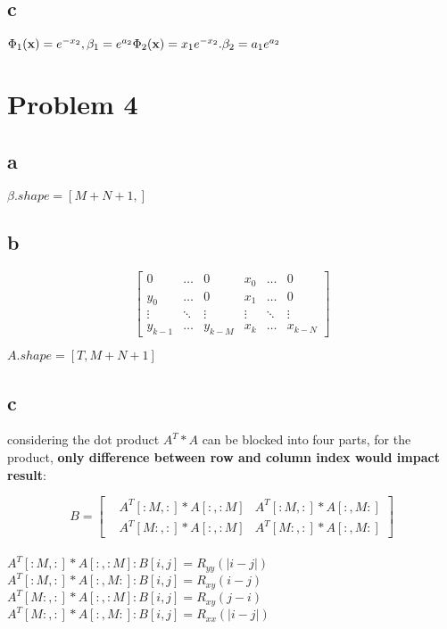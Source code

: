 \documentclass[]{article}
\begin{document}
\subsection{c}
$
\Phi_1(\textbf{x}) = e^{-x_2}, \beta_1 = e^{a_2}\\
\Phi_2(\textbf{x}) = x_1e^{-x_2}. \beta_2 = a_1e^{a_2}
$

\section{Problem 4}
\subsection{a}
$\beta.shape = [M+N+1,]$
\subsection{b}
\[
\begin{bmatrix}
	0 & \dots & 0 & x_{0} & \dots & 0 \\
	y_{0} & \dots & 0 & x_{1} & \dots & 0 \\
	\vdots & \ddots & \vdots & \vdots & \ddots & \vdots \\
	y_{k-1} & \dots & y_{k-M} & x_{k} & \dots & x_{k-N} 
\end{bmatrix}
\] 

$A.shape = [T, M+N+1]$

\subsection{c}
considering the dot product $A^T*A$ can be blocked into four parts, for the product, \textbf{only difference between row and column index would impact result}: 

\[B=
\begin{bmatrix}

& A^T[:M, :]*A[:, :M] & A^T[:M, :]*A[:, M:] \\
& A^T[M:, :]*A[:, :M] & A^T[M:, :]*A[:, M:] 
\end{bmatrix}
\] \\

$A^T[:M, :]*A[:, :M]: B[i, j] = R_{yy}(|i-j|)$ \\
$A^T[:M, :]*A[:, M:]: B[i, j] = R_{xy}(i-j)$ \\
$A^T[M:, :]*A[:, :M]: B[i, j] = R_{xy}(j-i)$ \\
$A^T[M:, :]*A[:, M:]: B[i, j] = R_{xx}(|i-j|)$\\
\end{document}
